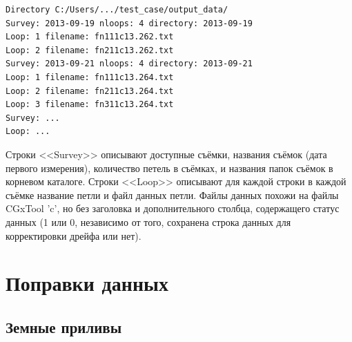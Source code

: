 \begin{verbatim}
Directory C:/Users/.../test_case/output_data/
Survey: 2013-09-19 nloops: 4 directory: 2013-09-19
Loop: 1 filename: fn111c13.262.txt
Loop: 2 filename: fn211c13.262.txt
Survey: 2013-09-21 nloops: 4 directory: 2013-09-21
Loop: 1 filename: fn111c13.264.txt
Loop: 2 filename: fn211c13.264.txt
Loop: 3 filename: fn311c13.264.txt
Survey: ...
Loop: ...
\end{verbatim}

Строки <<Survey>> описывают доступные съёмки, названия съёмок (дата первого
измерения), количество петель в съёмках, и названия папок
съёмок в корневом каталоге. Строки <<Loop>> описывают для каждой строки в каждой
съёмке название петли и файл данных петли. Файлы данных похожи на файлы CGxTool
'c', но без заголовка и дополнительного столбца, содержащего статус данных (1
или 0, независимо от того, сохранена строка данных для корректировки дрейфа или
нет).

\section[Поправки данных]{Поправки данных}
\label{sec:data_corrections}

\subsection[Земные приливы]{Земные приливы}
\label{subsec:earth_tides}

